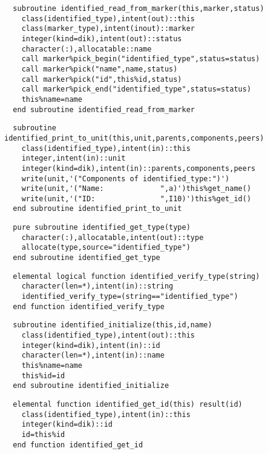 \begin{Verbatim}
  subroutine identified_read_from_marker(this,marker,status)
    class(identified_type),intent(out)::this
    class(marker_type),intent(inout)::marker
    integer(kind=dik),intent(out)::status
    character(:),allocatable::name
    call marker%pick_begin("identified_type",status=status)
    call marker%pick("name",name,status)
    call marker%pick("id",this%id,status)
    call marker%pick_end("identified_type",status=status)
    this%name=name
  end subroutine identified_read_from_marker
\end{Verbatim}

\begin{Verbatim}
  subroutine identified_print_to_unit(this,unit,parents,components,peers)
    class(identified_type),intent(in)::this
    integer,intent(in)::unit
    integer(kind=dik),intent(in)::parents,components,peers
    write(unit,'("Components of identified_type:")')
    write(unit,'("Name:             ",a)')this%get_name()
    write(unit,'("ID:               ",I10)')this%get_id()
  end subroutine identified_print_to_unit
\end{Verbatim}
  
\begin{Verbatim}
  pure subroutine identified_get_type(type)
    character(:),allocatable,intent(out)::type
    allocate(type,source="identified_type")
  end subroutine identified_get_type
\end{Verbatim}

\begin{Verbatim}
  elemental logical function identified_verify_type(string)
    character(len=*),intent(in)::string
    identified_verify_type=(string=="identified_type")
  end function identified_verify_type
\end{Verbatim}
\begin{Verbatim}
  subroutine identified_initialize(this,id,name)
    class(identified_type),intent(out)::this
    integer(kind=dik),intent(in)::id
    character(len=*),intent(in)::name
    this%name=name
    this%id=id
  end subroutine identified_initialize
\end{Verbatim}

\begin{Verbatim}
  elemental function identified_get_id(this) result(id)
    class(identified_type),intent(in)::this
    integer(kind=dik)::id
    id=this%id
  end function identified_get_id
\end{Verbatim}


